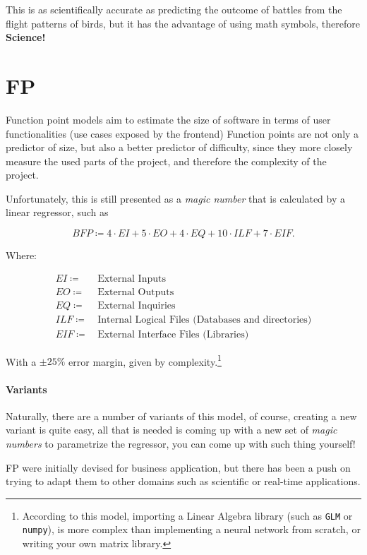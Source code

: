 \documentclass[openright, twoside, twocolumn]{report}
\begin{document}
This is as scientifically accurate as predicting the outcome of battles from the flight patterns of birds, but it has
the advantage of using math symbols, therefore \textbf{Science!}

\section{FP}
Function point models aim to estimate the size of software in terms of user functionalities (use cases exposed by the frontend)
Function points are not only a predictor of size, but also a better predictor of difficulty, since they more closely
measure the used parts of the project, and therefore the complexity of the project.

Unfortunately, this is still presented as a \emph{magic number} that is calculated by a linear regressor, such as

\[
  BFP \coloneqq  4 \cdot EI + 5 \cdot EO + 4 \cdot EQ + 10 \cdot ILF + 7 \cdot EIF
.\]

Where:

\begin{align*}
  EI \coloneqq \, & \text{External Inputs} \\
  EO \coloneqq \, & \text{External Outputs} \\
  EQ \coloneqq \, & \text{External Inquiries} \\
  ILF \coloneqq \, & \text{Internal Logical Files (Databases and directories)} \\
  EIF \coloneqq \, & \text{External Interface Files (Libraries)}
\end{align*}

With a $\pm 25\%$ error margin, given by complexity.\footnote{
  According to this model, importing a Linear Algebra library (such as \texttt{GLM} or \texttt{numpy}),
  is more complex than implementing a neural network from scratch, or writing your own matrix library.
}


\paragraph{Variants}
Naturally, there are a number of variants of this model, of course, creating a new variant is quite easy,
all that is needed is coming up with a new set of \emph{magic numbers} to parametrize the regressor,
you can come up with such thing yourself!

FP were initially devised for business application, but there has been a push on trying to adapt them
to other domains such as scientific or real-time applications.
\end{document}

